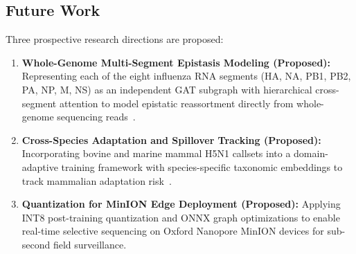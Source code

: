 \documentclass[conference]{IEEEtran}
\begin{document}
\subsection{Future Work}

Three prospective research directions are proposed:
\begin{enumerate}
    \item \textbf{Whole-Genome Multi-Segment Epistasis Modeling (Proposed):} Representing each of the eight influenza RNA segments (HA, NA, PB1, PB2, PA, NP, M, NS) as an independent GAT subgraph with hierarchical cross-segment attention to model epistatic reassortment directly from whole-genome sequencing reads~\cite{kawaoka1992,webster1992}.
    \item \textbf{Cross-Species Adaptation and Spillover Tracking (Proposed):} Incorporating bovine and marine mammal H5N1 callsets into a domain-adaptive training framework with species-specific taxonomic embeddings to track mammalian adaptation risk~\cite{dejong2006}.
    \item \textbf{Quantization for MinION Edge Deployment (Proposed):} Applying INT8 post-training quantization and ONNX graph optimizations to enable real-time selective sequencing on Oxford Nanopore MinION devices for sub-second field surveillance.
\end{enumerate}



\end{document}
